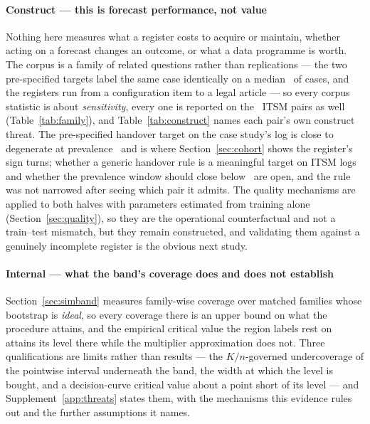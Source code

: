 \documentclass[11pt,3p,review,authoryear]{elsarticle}
\theoremstyle{definition}
\begin{document}
\paragraph{Construct --- this is forecast performance, not value}
Nothing here measures what a register costs to acquire or maintain, whether
acting on a forecast changes an outcome, or what a data programme is worth.
The corpus is a family of related questions rather than replications --- the
two pre-specified targets label the same case identically on a median
\targetAgreement\ of cases, and the registers run from a configuration item to
a legal article --- so every corpus statistic is about \emph{sensitivity},
every one is reported on the \nItsmPairs\ ITSM pairs as well
(Table~\ref{tab:family}), and Table~\ref{tab:construct} names each pair's own
construct threat. The pre-specified handover target on the case study's log is
close to degenerate at prevalence \prevAdmittedMax\ and is where
Section~\ref{sec:cohort} shows the register's sign turns; whether a generic
handover rule is a meaningful target on ITSM logs and whether the prevalence
window should close below \prevHi\ are open, and the rule was not narrowed
after seeing which pair it admits. The quality mechanisms are applied to both
halves with parameters estimated from training alone
(Section~\ref{sec:quality}), so they are the operational counterfactual and
not a train--test mismatch, but they remain constructed, and validating them
against a genuinely incomplete register is the obvious next study.

\paragraph{Internal --- what the band's coverage does and does not establish}
Section~\ref{sec:simband} measures family-wise coverage over matched families
whose bootstrap is \emph{ideal}, so every coverage there is an upper bound on
what the procedure attains, and the empirical critical value the region
labels rest on attains its level there while the multiplier approximation
does not. Three qualifications are limits rather than results --- the
$K/n$-governed undercoverage of the pointwise interval underneath the band,
the width at which the level is bought, and a decision-curve critical value
about a point short of its level --- and Supplement~\ref{app:threats} states
them, with the mechanisms this evidence rules out and the further
assumptions it names.
\end{document}
